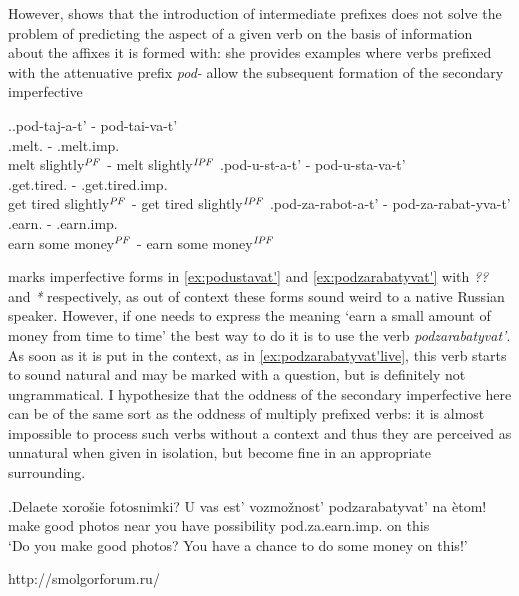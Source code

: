 However, \cite{Kagan:book} shows that the introduction of intermediate prefixes does not solve the problem of predicting the aspect of a given verb on the basis of information about the affixes it is formed with: she provides examples where verbs prefixed with the attenuative prefix \textit{pod-} allow the subsequent formation of the secondary imperfective \citep[35, ex.~\ref{ex:pod} here]{Kagan:book}

\ex.\label{ex:pod}\ag.pod-taj-a-t' - pod-tai-va-t'\\
.melt. - .melt.imp.\\
melt slightly$^{\mathit{PF}}$ - melt slightly$^{\mathit{IPF}}$
\bg.\label{ex:podustavat'}pod-u-st-a-t' - pod-u-sta-va-t'\\
.get.tired. - .get.tired.imp.\\
get tired slightly$^{\mathit{PF}}$ - get tired slightly$^{\mathit{IPF}}$
\bg.\label{ex:podzarabatyvat'}pod-za-rabot-a-t' - pod-za-rabat-yva-t'\\
.earn. - .earn.imp.\\
earn some money$^{\mathit{PF}}$ - earn some money$^{\mathit{IPF}}$

\cite{Kagan:book} marks imperfective forms in \ref{ex:podustavat'} and \ref{ex:podzarabatyvat'} with \textit{??} and \textit{*} respectively, as out of context these forms sound weird to a native Russian speaker. However, if one needs to express the meaning `earn a small amount of money from time to time' the best way to do it is to use the verb \textit{podzarabatyvat'}. As soon as it is put in the context, as in \ref{ex:podzarabatyvat'live}, this verb starts to sound natural and may be marked with a question, but is definitely not ungrammatical. I hypothesize that the oddness of the secondary imperfective here can be of the same sort as the oddness of multiply prefixed verbs: it is almost impossible to process such verbs without a context and thus they are perceived as unnatural when given in isolation, but become fine in an appropriate surrounding.

\exg.\label{ex:podzarabatyvat'live}Delaete xoro\v{s}ie fotosnimki? U vas est' vozmo\v{z}nost' podzarabatyvat' na \`{e}tom!\\
make good photos near you have possibility pod.za.earn.imp. on this\\
\vspace{0.5em}
`Do you make good photos? You have a chance to do some money on this!'\\
\begin{flushright}
\vspace{-1em}
http://smolgorforum.ru/
\end{flushright}

